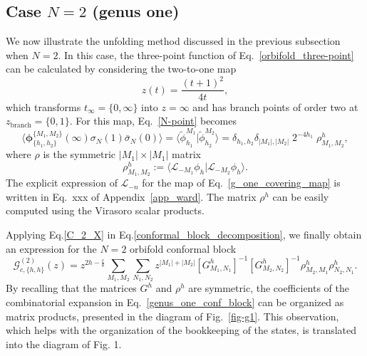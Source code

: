 \documentclass[a4paper,11pt]{article}
\begin{document}
 

\subsection{Case $N=2$ (genus one)}
We now illustrate the unfolding method discussed in the previous subsection when $N=2$. 
In this case, the three-point function of Eq.~\eqref{orbifold_three-point} can be calculated
by considering the two-to-one map
\begin{equation}\label{g_one_covering_map}
 z(t)=\frac{(t+1)^2}{4t},
\end{equation}
which transforms $t_{\infty}=\{0,\infty\}$ into $z=\infty$ and has branch points of 
order two at $z_{\text{branch}}=\{0, 1\}$. For this map, Eq.~\eqref{N-point} becomes
\begin{equation}\label{C_2_X}
 \langle \boldsymbol{\phi}^{\{M_1,M_2\}}_{\{h_1,h_2\}}(\infty) \sigma_{N}(1)\bar{\sigma}_{N}(0)\rangle=\langle \tilde{\phi}_{h_1}^{M_1} | \tilde{\phi}_{h_2}^{M_2}\rangle=
 \delta_{h_1, h_2}\delta_{|M_1|,|M_2|}\;2^{-4 h_1} \;\rho^h_{M_1,M_2},
\end{equation}
where $\rho$ is the symmetric $|M_1|\times|M_1|$ matrix
\begin{equation}
\label{rho}
 \rho^h_{M_1,M_2}:=\langle \mathcal{L}_{-M_1}\phi_{h}|\mathcal{L}_{-M_2}\phi_{h}\rangle.
\end{equation}
The explicit expression of $\mathcal{L}_{-n}$ for the map of Eq.~\eqref{g_one_covering_map}
is written in Eq.~xxx of Appendix~\ref{app_ward}. The matrix $\rho^h$  can be easily computed 
using the Virasoro scalar products.

Applying Eq.\eqref{C_2_X} in Eq.\eqref{conformal_block_decomposition}, we finally obtain an 
expression for the $N=2$ orbifold conformal block
\begin{equation}\label{genus_one_conf_block}
 \mathcal{G}_{c, \{h,h\}}^{(2)}(z)=z^{2h-\frac{c}{8}}\sum_{M_1, M_2}\sum_{N_1, N_2}
 z^{|M_1|+|M_2|}[G^{h}_{M_1,N_1}]^{-1}[G^{h}_{ M_2,N_2}]^{-1}
 \rho^h_{M_2,M_1}\rho^h_{N_2,N_1}.
\end{equation}
By recalling that the matrices $G^h$ and $\rho^h$ are symmetric, the coefficients of the combinatorial 
expansion in Eq.~\eqref{genus_one_conf_block} can be organized as matrix products, presented in the diagram 
of Fig.~\ref{fig-g1}. This observation, which helps with the organization of the bookkeeping of the states, 
is translated into the diagram of Fig. 1.
\end{document}

